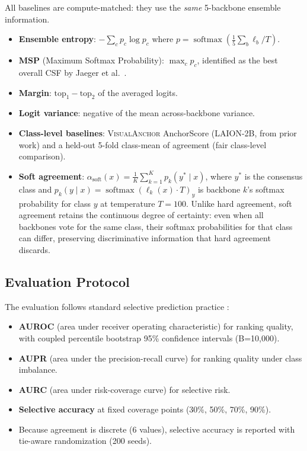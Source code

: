 \documentclass[a4paper,fleqn]{cas-sc}
\newcommand{\va}{\textsc{VisualAnchor}}
\begin{document}
All baselines are compute-matched: they use the \emph{same} 5-backbone ensemble information.
\begin{itemize}
    \item \textbf{Ensemble entropy}: $-\sum_c p_c \log p_c$ where $p = \operatorname{softmax}(\frac{1}{5}\sum_b \ell_b / T)$.
    \item \textbf{MSP} (Maximum Softmax Probability): $\max_c p_c$, identified as the best overall CSF by Jaeger et al.\ \citep{jaeger2023call}.
    \item \textbf{Margin}: $\text{top}_1 - \text{top}_2$ of the averaged logits.
    \item \textbf{Logit variance}: negative of the mean across-backbone variance.
    \item \textbf{Class-level baselines}: \va{} AnchorScore (LAION-2B, from prior work) and a held-out 5-fold class-mean of agreement (fair class-level comparison).
    \item \textbf{Soft agreement}: $\alpha_{\text{soft}}(x) = \frac{1}{K}\sum_{k=1}^{K} p_k(y^* \mid x)$, where $y^*$ is the consensus class and $p_k(y \mid x) = \operatorname{softmax}(\ell_k(x) \cdot T)_y$ is backbone $k$'s softmax probability for class $y$ at temperature $T=100$.
    Unlike hard agreement, soft agreement retains the continuous degree of certainty: even when all backbones vote for the same class, their softmax probabilities for that class can differ, preserving discriminative information that hard agreement discards.
\end{itemize}

\subsection{Evaluation Protocol}

The evaluation follows standard selective prediction practice \citep{geifman2017selective, jaeger2023call}:
\begin{itemize}
    \item \textbf{AUROC} (area under receiver operating characteristic) for ranking quality, with coupled percentile bootstrap 95\% confidence intervals (B=10,000).
    \item \textbf{AUPR} (area under the precision-recall curve) for ranking quality under class imbalance.
    \item \textbf{AURC} (area under risk-coverage curve) for selective risk.
    \item \textbf{Selective accuracy} at fixed coverage points (30\%, 50\%, 70\%, 90\%).
    \item Because agreement is discrete (6 values), selective accuracy is reported with tie-aware randomization (200 seeds).
\end{itemize}
\end{document}
